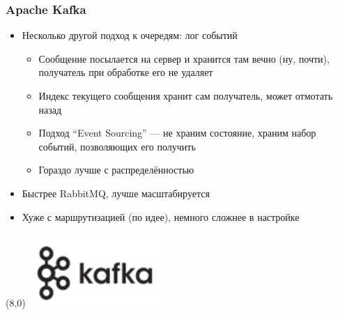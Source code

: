 \documentclass[xetex,mathserif,serif]{beamer}
\begin{document}
    \begin{frame}
        \frametitle{Apache Kafka}
        \begin{itemize}
            \item Несколько другой подход к очередям: лог событий
            \begin{itemize}
                \item Сообщение посылается на сервер и хранится там вечно (ну, почти), получатель при обработке его не удаляет
                \item Индекс текущего сообщения хранит сам получатель, может отмотать назад
                \item Подход ``Event Sourcing'' --- не храним состояние, храним набор событий, позволяющих его получить
                \item Гораздо лучше с распределённостью
            \end{itemize}
            \item Быстрее RabbitMQ, лучше масштабируется
            \item Хуже с маршрутизацией (по идее), немного сложнее в настройке
        \end{itemize}
        \begin{textblock}{3}(8,0)
            \includegraphics[width=\textwidth]{kafkaLogo.png}
        \end{textblock}
    \end{frame}
\end{document}
